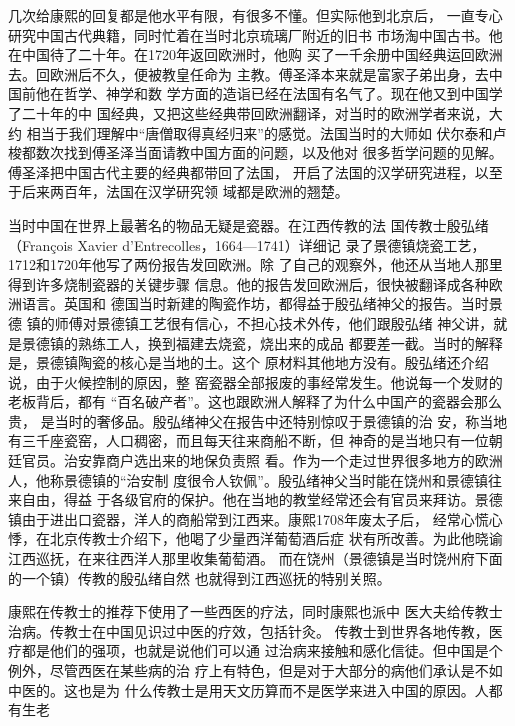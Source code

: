 几次给康熙的回复都是他水平有限，有很多不懂。但实际他到北京后，%
一直专心研究中国古代典籍，同时忙着在当时北京琉璃厂附近的旧书%
市场淘中国古书。他在中国待了二十年。在1720年返回欧洲时，他购%
买了一千余册中国经典运回欧洲去。回欧洲后不久，便被教皇任命为%
主教。傅圣泽本来就是富家子弟出身，去中国前他在哲学、神学和数%
学方面的造诣已经在法国有名气了。现在他又到中国学了二十年的中%
国经典，又把这些经典带回欧洲翻译，对当时的欧洲学者来说，大约%
相当于我们理解中“唐僧取得真经归来”的感觉。法国当时的大师如%
伏尔泰和卢梭都数次找到傅圣泽当面请教中国方面的问题，以及他对%
很多哲学问题的见解。傅圣泽把中国古代主要的经典都带回了法国，%
开启了法国的汉学研究进程，以至于后来两百年，法国在汉学研究领%
域都是欧洲的翘楚。%
\par
当时中国在世界上最著名的物品无疑是瓷器。在江西传教的法%
国传教士殷弘绪（François Xavier d'Entrecolles，1664—1741）详细记%
录了景德镇烧瓷工艺，1712和1720年他写了两份报告发回欧洲。除%
了自己的观察外，他还从当地人那里得到许多烧制瓷器的关键步骤%
信息。他的报告发回欧洲后，很快被翻译成各种欧洲语言。英国和%
德国当时新建的陶瓷作坊，都得益于殷弘绪神父的报告。当时景德%
镇的师傅对景德镇工艺很有信心，不担心技术外传，他们跟殷弘绪%
神父讲，就是景德镇的熟练工人，换到福建去烧瓷，烧出来的成品%
都要差一截。当时的解释是，景德镇陶瓷的核心是当地的土。这个%
原材料其他地方没有。殷弘绪还介绍说，由于火候控制的原因，整%
窑瓷器全部报废的事经常发生。他说每一个发财的老板背后，都有%
“百名破产者”。这也跟欧洲人解释了为什么中国产的瓷器会那么贵，%
是当时的奢侈品。殷弘绪神父在报告中还特别惊叹于景德镇的治%
安，称当地有三千座瓷窑，人口稠密，而且每天往来商船不断，但%
神奇的是当地只有一位朝廷官员。治安靠商户选出来的地保负责照%
看。作为一个走过世界很多地方的欧洲人，他称景德镇的“治安制%
度很令人钦佩”。殷弘绪神父当时能在饶州和景德镇往来自由，得益%
于各级官府的保护。他在当地的教堂经常还会有官员来拜访。景德%
镇由于进出口瓷器，洋人的商船常到江西来。康熙1708年废太子后，%
经常心慌心悸，在北京传教士介绍下，他喝了少量西洋葡萄酒后症%
状有所改善。为此他晓谕江西巡抚，在来往西洋人那里收集葡萄酒。%
而在饶州（景德镇是当时饶州府下面的一个镇）传教的殷弘绪自然%
也就得到江西巡抚的特别关照。%
\par
康熙在传教士的推荐下使用了一些西医的疗法，同时康熙也派中%
医大夫给传教士治病。传教士在中国见识过中医的疗效，包括针灸。%
传教士到世界各地传教，医疗都是他们的强项，也就是说他们可以通%
过治病来接触和感化信徒。但中国是个例外，尽管西医在某些病的治%
疗上有特色，但是对于大部分的病他们承认是不如中医的。这也是为%
什么传教士是用天文历算而不是医学来进入中国的原因。人都有生老%
